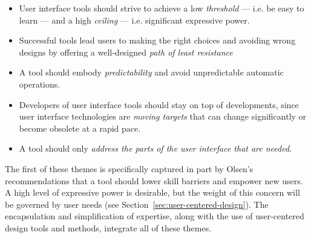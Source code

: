 \begin{itemize}
\item User interface tools should strive to achieve a low \emph{threshold} --- i.e. be easy to learn --- and a high \emph{ceiling} --- i.e. significant expressive power.
\item Successful tools lead users to making the right choices and avoiding wrong designs by offering a well-designed \emph{path of least resistance}
\item A tool should embody \emph{predictability} and avoid unpredictable automatic operations.
\item Developers of user interface tools should stay on top of developments, since user interface technologies are \emph{moving targets} that can change significantly or become obsolete at a rapid pace.
\item A tool should only \emph{address the parts of the user interface that are needed}.
\end{itemize}

The first of these themes is specifically captured in part by Olsen's recommendations that a tool should lower skill barriers and empower new users. A high level of expressive power is desirable, but the weight of this concern will be governed by user needs (see Section~\ref{sec:user-centered-design}). The encapsulation and simplification of expertise, along with the use of user-centered design tools and methods, integrate all of these themes.

